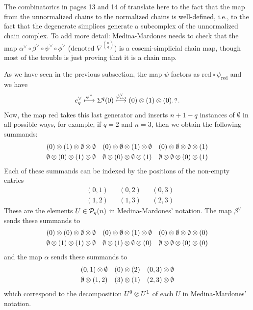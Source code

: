 \begin{remark}	
	The combinatorics in pages 13 and 14  of \cite{medina2021fast_sq} translate here to the fact that the map from the unnormalized chains to the normalized chains is well-defined, i.e., to the fact that the degenerate simplices generate a subcomplex of the unnormalized chain complex. To add more detail: Medina-Mardones needs to check that the map $\alpha^\vee\circ \beta^{\vee}\circ \psi^\vee\circ \phi^\vee$ (denoted $\nabla^{\binom{n}{q}}$) is a cosemi-simplicial chain map, though most of the trouble is just proving that it is a chain map.
	
	As we have seen in the previous subsection, the map $\psi$ factors as $\mathrm{red}\circ \psi_{\mathrm{red}}$ and we have
	\[
		e_q^{\vee}\overset{\phi^\vee}{\longmapsto}
		\Sigma^{q}(0)\overset{\psi^\vee_{\mathrm{red}}}{\longmapsto}
		(0)\otimes(1)\otimes(0)\overset{q}{\ldots} 
	\]
	Now, the map $\mathrm{red}$ takes this last generator and inserts $n+1-q$ instances of $\emptyset$ in all possible ways, for example, if $q=2$ and $n=3$, then we obtain the following summands:
	\begin{align*}
		&(0)\otimes(1)\otimes\emptyset\otimes\emptyset
		&
		&(0)\otimes\emptyset\otimes(1)\otimes\emptyset
		&
		&(0)\otimes\emptyset\otimes\emptyset\otimes(1)
		\\
		&\emptyset\otimes(0)\otimes(1)\otimes\emptyset
		&
		&\emptyset\otimes(0)\otimes\emptyset\otimes(1)
		&
		&\emptyset\otimes\emptyset\otimes(0)\otimes(1)
	\end{align*}
	Each of these summands can be indexed by the positions of the non-empty entries
	\begin{align*}
		&(0,1)&& (0,2)&&(0,3)
		\\
		&(1,2)&& (1,3) &&(2,3)
	\end{align*}
	These are the elements $U\in \mathcal{P}_q(n)$ in Medina-Mardones' notation. The map $\beta^\vee$ sends these summands to
	\begin{align*}
		&(0)\otimes(0)\otimes\emptyset\otimes\emptyset
		&
		&(0)\otimes\emptyset\otimes(1)\otimes\emptyset
		&
		&(0)\otimes\emptyset\otimes\emptyset\otimes(0)
		\\
		&\emptyset\otimes(1)\otimes(1)\otimes\emptyset
		&
		&\emptyset\otimes(1)\otimes\emptyset\otimes(0)
		&
		&\emptyset\otimes\emptyset\otimes(0)\otimes(0)
	\end{align*}
	and the map $\alpha$ sends these summands to
	\begin{align*}
		&(0,1)\otimes \emptyset
		&
		&(0)\otimes (2)
		&
		&(0,3)\otimes \emptyset
		\\
		&\emptyset\otimes(1,2)
		&
		&(3)\otimes (1)
		&
		&(2,3)\otimes\emptyset
	\end{align*}
	which correspond to the decomposition $U^0\otimes U^1$ of each $U$ in Medina-Mardones' notation. 


\end{remark}
